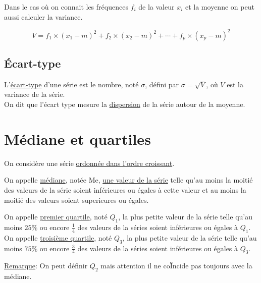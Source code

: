 \documentclass[french]{book}
\begin{document}
\begin{prop}
Dans le cas où on connait les fréquences $f_i$ de la valeur $x_i$ et la moyenne on peut aussi calculer la variance.

$$V=f_1 \times (x_1 - m)^2 +f_2 \times (x_2 - m)^2 +\cdots+ f_p \times (x_p - m)^2$$
\end{prop}

\subsection{Écart-type}

\begin{defn}
L'\underline{écart-type} d'une série est le nombre, noté $\sigma$, défini par $\sigma=\sqrt{V}$, où $V$ est la variance de la série.\\

On dit que l'écart type mesure la \underline{dispersion} de la série autour de la moyenne.
\end{defn}


\section{Médiane et quartiles}
On considère une série \underline{ordonnée  dans l'ordre croissant}.\\

\begin{defn}
On appelle \underline{médiane}, notée Me, \underline{une valeur de la série} telle qu'au moins la moitié des valeurs de la série soient inférieures ou égales à cette valeur et au moins la moitié des valeurs soient superieures ou égales.
\end{defn}

\begin{defn}
On appelle \underline{premier quartile}, noté $Q_1$, la plus petite valeur de la série telle qu'au moins $25\% $ ou encore $\frac{1}{4}$ des valeurs de la séries soient inférieures ou égales à $Q_1$.\\

On appelle \underline{troisième quartile}, noté $Q_3$, la plus petite valeur de la série telle qu'au moins $75\% $ ou encore $\frac{3}{4}$ des valeurs de la séries soient inférieures ou égales à $Q_3$.
\end{defn}

\underline{Remarque}: On peut définir $Q_2$ mais attention il ne coÏncide pas toujours avec la médiane.\\
\end{document}
